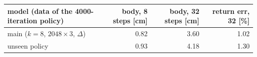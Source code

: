 \begin{tabular}{lrrr}\toprule
model (data of the 4000-iteration policy) & body, 8 steps [cm] & body, 32 steps [cm] & return err, 32 [\%] \\\midrule
main ($k{=}8$, $2048{\times}3$, $\Delta$) & 0.82 & 3.60 & 1.02 \\
unseen policy & 0.93 & 4.18 & 1.30 \\
\bottomrule\end{tabular}
